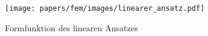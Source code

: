 %
%
%
\begin{figure}
    \centering
    \texttt{[image: papers/fem/images/linearer\_ansatz.pdf]}
    \caption{Formfunktion des linearen Ansatzes}
    \label{fem:1d:abb:linear}
    \end{figure}
    